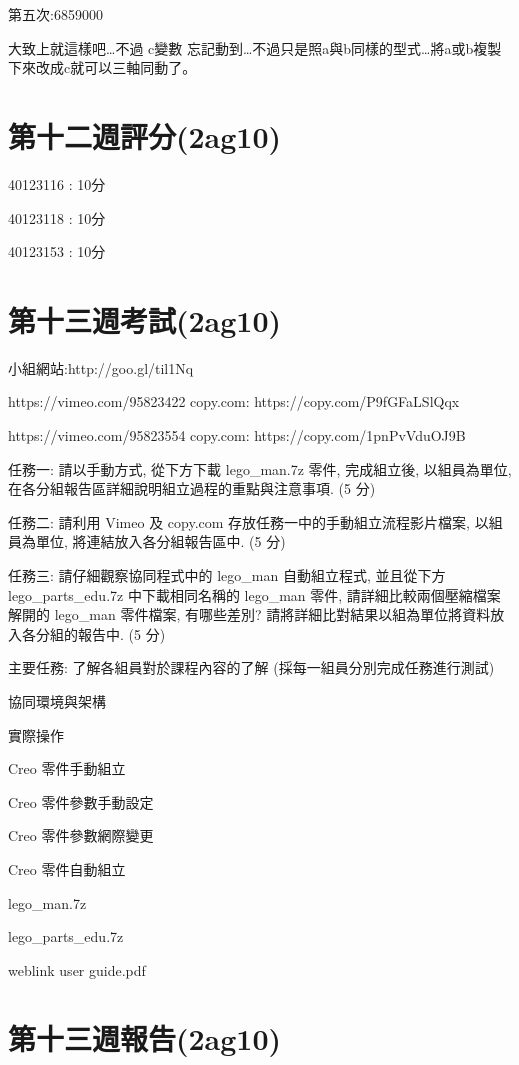\documentclass[]{article}
\begin{document}
第五次:6859000

大致上就這樣吧\ldots{}不過 c變數
忘記動到\ldots{}不過只是照a與b同樣的型式\ldots{}將a或b複製下來改成c就可以三軸同動了。

\section{第十二週評分(2ag10)}\label{ux7b2cux5341ux4e8cux9031ux8a55ux52062ag10}

40123116 : 10分

40123118 : 10分

40123153 : 10分

\section{第十三週考試(2ag10)}\label{ux7b2cux5341ux4e09ux9031ux8003ux8a662ag10}

小組網站:http://goo.gl/til1Nq

https://vimeo.com/95823422 copy.com: https://copy.com/P9fGFaLSlQqx

https://vimeo.com/95823554 copy.com: https://copy.com/1pnPvVduOJ9B

任務一: 請以手動方式, 從下方下載 lego\_man.7z 零件, 完成組立後,
以組員為單位, 在各分組報告區詳細說明組立過程的重點與注意事項. (5 分)

任務二: 請利用 Vimeo 及 copy.com 存放任務一中的手動組立流程影片檔案,
以組員為單位, 將連結放入各分組報告區中. (5 分)

任務三: 請仔細觀察協同程式中的 lego\_man 自動組立程式, 並且從下方
lego\_parts\_edu.7z 中下載相同名稱的 lego\_man 零件,
請詳細比較兩個壓縮檔案解開的 lego\_man 零件檔案, 有哪些差別?
請將詳細比對結果以組為單位將資料放入各分組的報告中. (5 分)

主要任務: 了解各組員對於課程內容的了解 (採每一組員分別完成任務進行測試)

協同環境與架構

實際操作

Creo 零件手動組立

Creo 零件參數手動設定

Creo 零件參數網際變更

Creo 零件自動組立

lego\_man.7z

lego\_parts\_edu.7z

weblink user guide.pdf

\section{第十三週報告(2ag10)}\label{ux7b2cux5341ux4e09ux9031ux5831ux544a2ag10}
\end{document}

